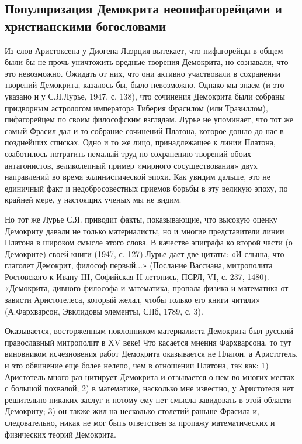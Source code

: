 \subsection{Популяризация Демокрита неопифагорейцами и христианскими
богословами}

Из слов Аристоксена у Диогена Лаэрция вытекает, что пифагорейцы в
общем были бы не прочь уничтожить вредные творения Демокрита, но
сознавали, что это невозможно. Ожидать от них, что они активно
участвовали в сохранении творений Демокрита, казалось бы, было
невозможно. Однако мы знаем (и это указано и у С.Я.Лурье, 1947, с.
138), что сочинения Демокрита были собраны придворным астрологом
императора Тиберия Фрасилом (или Тразиллом), пифагорейцем по своим
философским взглядам. Лурье не упоминает, что тот же самый Фрасил дал
и то собрание сочинений Платона, которое дошло до нас в позднейших
списках. Одно и то же лицо, принадлежащее к линии Платона, озаботилось
потратить немалый труд по сохранению творений обоих антагонистов,
великолепный пример «мирного сосуществования» двух направлений во
время эллинистической эпохи. Как увидим дальше, это не единичный факт
и недобросовестных приемов борьбы в эту великую эпоху, по крайней
мере, у настоящих ученых мы не видим.

Но тот же Лурье С.Я. приводит факты, показывающие, что высокую оценку
Демокриту давали не только материалисты, но и многие представители
линии Платона в широком смысле этого слова. В качестве эпиграфа ко
второй части (о Демокрите) своей книги (1947, с. 127) Лурье дает две
цитаты: «И слыша, что глаголет Демокрит, философ первый...» (Послание
Вассиана, митрополита Ростовского к Ивану III, Софийская II летопись,
ПСРЛ, VI, с. 237, 1480). «Демокрита, дивного философа и математика,
пропала физика и математика от зависти Аристотелеса, который желал,
чтобы только его книги читали» (А.Фархварсон, Эвклидовы элементы,
СПб, 1789, с. 3).

Оказывается, восторженным поклонником материалиста Демокрита был
русский православный митрополит в XV веке! Что касается мнения
Фархварсона, то тут виновником исчезновения работ Демокрита
оказывается не Платон, а Аристотель, и это обвинение еще более нелепо,
чем в отношении Платона, так как: 1) Аристотель много раз цитирует
Демокрита и отзывается о нем во многих местах с большой похвалой; 2) в
математике, насколько мне известно, у Аристотеля нет решительно
никаких заслуг и потому ему нет смысла завидовать в этой области
Демокриту; 3) он также жил на несколько столетий раньше Фрасила и,
следовательно, никак не мог быть ответствен за пропажу математических
и физических теорий Демокрита.

